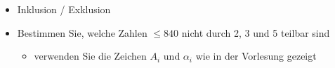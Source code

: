 \begin{aufgabe}
\begin{itemize}
  \item Inklusion / Exklusion
  \item Bestimmen Sie, welche Zahlen $\le 840$ nicht durch 2, 3 und 5 teilbar sind
  \begin{itemize}
    \item verwenden Sie die Zeichen $A_i$ und $\alpha_i$ wie in der Vorlesung gezeigt
  \end{itemize}
\end{itemize}
\end{aufgabe}
